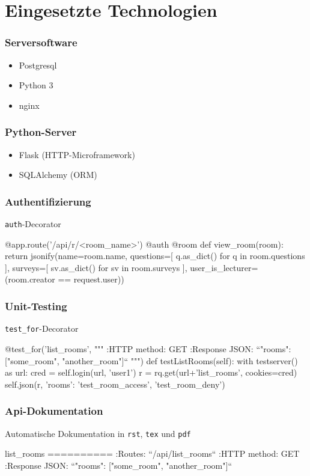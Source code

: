 \documentclass{beamer}
\begin{document}
\section{Eingesetzte Technologien}
\begin{frame}
    \frametitle{Serversoftware}
    \begin{itemize}
        \item Postgresql
        \item Python 3
        \item nginx
    \end{itemize}
\end{frame}
\begin{frame}
    \frametitle{Python-Server}
    \begin{itemize}
        \item Flask (HTTP-Microframework)
        \item SQLAlchemy (ORM)
    \end{itemize}
\end{frame}
\begin{frame}[fragile]
    \frametitle{Authentifizierung}
    \begin{block}{\texttt{auth}-Decorator}
    \begin{python3code}
@app.route('/api/r/<room_name>')
@auth
@room
def view_room(room):
    return jsonify(name=room.name,
            questions=[ q.as_dict() for q in room.questions ],
            surveys=[ sv.as_dict() for sv in room.surveys ],
            user_is_lecturer=(room.creator == request.user))
    \end{python3code}
    \end{block}
\end{frame}
\begin{frame}[fragile]
    \frametitle{Unit-Testing}
    \begin{block}{\texttt{test\_for}-Decorator}
    \begin{python3code}
@test_for('list_rooms', """
:HTTP method:   GET
:Response JSON: ``{"rooms": ["some_room", "another_room"]}`` """)
def testListRooms(self):
    with testserver() as url:
        cred = self.login(url, 'user1')
        r = rq.get(url+'list_rooms', cookies=cred)
        self.json(r, {'rooms': {'test_room_access', 'test_room_deny'}})
    \end{python3code}
    \end{block}
\end{frame}
\begin{frame}[fragile]
    \frametitle{Api-Dokumentation}
    \begin{block}{Automatische Dokumentation in \texttt{rst}, \texttt{tex} und \texttt{pdf}}
    \begin{rstcode}
list_rooms
==========
:Routes:
    ``/api/list_rooms``
:HTTP method:   GET
:Response JSON: ``{"rooms": ["some_room", "another_room"]}``
    \end{rstcode}
    \end{block}
\end{frame}
\end{document}
